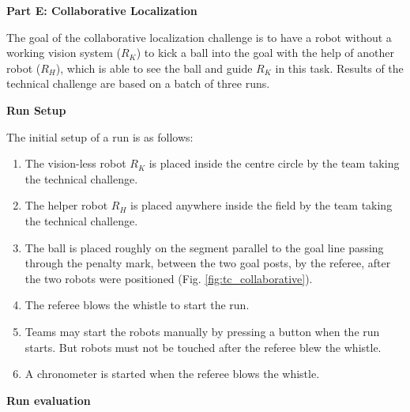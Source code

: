 \clearpage
\sffamily
{\bfseries\color[rgb]{0.4,0.4,0.4} Part E: Collaborative Localization}
{}


\bigskip

The goal of the collaborative localization challenge is to have a  robot without a working vision system ($R_K$) to kick a ball
into the goal with the help of another robot ($R_H$), which is able to see the ball and guide $R_K$ in this task. Results of the technical challenge are based on a batch of three runs.

\bigskip

{\bfseries Run Setup}

\smallskip


The initial setup of a run is as follows:

\begin{enumerate}

\item The vision-less robot $R_K$ is placed inside the centre circle by the team taking the technical challenge.

\item The helper robot $R_H$ is placed anywhere inside the field by the team taking the technical challenge.

\item The ball is placed roughly on the segment parallel to the goal line passing through the penalty mark, between the two goal posts, by the referee, after the two robots were positioned (Fig. \ref{fig:tc_collaborative}).

\item The referee blows the whistle to start the run.

\item Teams may start the robots manually by pressing a button when the run starts. But robots must not be touched after the referee blew the whistle. 

\item A chronometer is started when the referee blows the whistle.
\end{enumerate}

{\bfseries Run evaluation}

\smallskip

